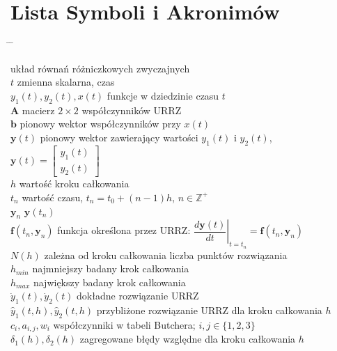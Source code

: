 \documentclass[a4paper, 12pt, twoside, openany]{article}
\newcommand{\y}{\mathbf{y}}
\begin{document}
    \section{Lista Symboli i Akronimów}
    \begin{spacing}{1.5}
    \begin{tabbing}
        \hspace{5cm} \= \hspace{10cm} \= \kill

         \> układ równań różniczkowych zwyczajnych \\
        $t$ \> zmienna skalarna, czas \\
        $y_1(t),y_2(t),x(t)$ \> funkcje w dziedzinie czasu $t$ \\
        $\textbf{A}$ \> macierz $2\times2$ współczynników URRZ \\
        $\textbf{b}$ \> pionowy wektor współczynników przy $x(t)$ \\
        $\y(t)$ \> pionowy wektor zawierający wartości $y_1(t)$ i $y_2(t)$, $\y(t) = \begin{bmatrix} y_1(t)\\y_2(t) \end{bmatrix}$ \\
        $h$ \> wartość kroku całkowania \\
        $t_n$ \> wartość czasu, $t_n = t_0 + (n-1)h$, $n \in \mathbb{Z}^+$ \\
        $\y_n$ \> $\y(t_n)$ \\
        $\mathbf{f}(t_n,\y_n)$ \> funkcja określona przez URRZ: $\left. \dfrac{d\y(t)}{dt} \right|_{t=t_n} = \mathbf{f}(t_n,\y_n)$ \\
        $N(h)$ \> zależna od kroku całkowania liczba punktów rozwiązania \\
        $h_{min}$ \> najmniejszy badany krok całkowania \\
        $h_{max}$ \> największy badany krok całkowania \\
        $\dot{y}_1(t),\dot{y}_2(t)$ \> dokładne rozwiązanie URRZ \\
        $\hat{y}_1(t,h),\hat{y}_2(t,h)$ \> przybliżone rozwiązanie URRZ dla kroku całkowania $h$ \\
        $c_i, a_{i,j}, w_i$ \> współczynniki w tabeli Butchera; $i,j \in \{1,2,3\}$ \\
        $\delta_1(h), \delta_2(h)$ \> zagregowane błędy względne dla kroku całkowania $h$\\
    \end{tabbing}
    \end{spacing}
    \newpage
\end{document}
